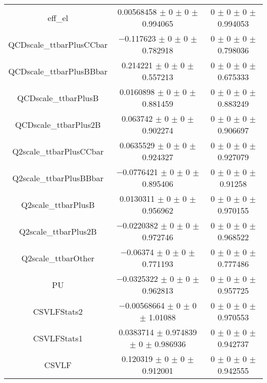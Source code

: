 \begin{table}
\begin{tabular}{ccc}
eff\_el & \num{0.00568458} $\pm$ \num{0} $\pm$ \num{0} $\pm$ \num{0.994065} & \num{0} $\pm$ \num{0} $\pm$ \num{0} $\pm$ \num{0.994053}\\
QCDscale\_ttbarPlusCCbar & \num{-0.117623} $\pm$ \num{0} $\pm$ \num{0} $\pm$ \num{0.782918} & \num{0} $\pm$ \num{0} $\pm$ \num{0} $\pm$ \num{0.798036}\\
QCDscale\_ttbarPlusBBbar & \num{0.214221} $\pm$ \num{0} $\pm$ \num{0} $\pm$ \num{0.557213} & \num{0} $\pm$ \num{0} $\pm$ \num{0} $\pm$ \num{0.675333}\\
QCDscale\_ttbarPlusB & \num{0.0160898} $\pm$ \num{0} $\pm$ \num{0} $\pm$ \num{0.881459} & \num{0} $\pm$ \num{0} $\pm$ \num{0} $\pm$ \num{0.883249}\\
QCDscale\_ttbarPlus2B & \num{0.063742} $\pm$ \num{0} $\pm$ \num{0} $\pm$ \num{0.902274} & \num{0} $\pm$ \num{0} $\pm$ \num{0} $\pm$ \num{0.906697}\\
Q2scale\_ttbarPlusCCbar & \num{0.0635529} $\pm$ \num{0} $\pm$ \num{0} $\pm$ \num{0.924327} & \num{0} $\pm$ \num{0} $\pm$ \num{0} $\pm$ \num{0.927079}\\
Q2scale\_ttbarPlusBBbar & \num{-0.0776421} $\pm$ \num{0} $\pm$ \num{0} $\pm$ \num{0.895406} & \num{0} $\pm$ \num{0} $\pm$ \num{0} $\pm$ \num{0.91258}\\
Q2scale\_ttbarPlusB & \num{0.0130311} $\pm$ \num{0} $\pm$ \num{0} $\pm$ \num{0.956962} & \num{0} $\pm$ \num{0} $\pm$ \num{0} $\pm$ \num{0.970155}\\
Q2scale\_ttbarPlus2B & \num{-0.0220382} $\pm$ \num{0} $\pm$ \num{0} $\pm$ \num{0.972746} & \num{0} $\pm$ \num{0} $\pm$ \num{0} $\pm$ \num{0.968522}\\
Q2scale\_ttbarOther & \num{-0.06374} $\pm$ \num{0} $\pm$ \num{0} $\pm$ \num{0.771193} & \num{0} $\pm$ \num{0} $\pm$ \num{0} $\pm$ \num{0.777486}\\
PU & \num{-0.0325322} $\pm$ \num{0} $\pm$ \num{0} $\pm$ \num{0.962813} & \num{0} $\pm$ \num{0} $\pm$ \num{0} $\pm$ \num{0.957725}\\
CSVLFStats2 & \num{-0.00568664} $\pm$ \num{0} $\pm$ \num{0} $\pm$ \num{1.01088} & \num{0} $\pm$ \num{0} $\pm$ \num{0} $\pm$ \num{0.970553}\\
CSVLFStats1 & \num{0.0383714} $\pm$ \num{0.974839} $\pm$ \num{0} $\pm$ \num{0.986936} & \num{0} $\pm$ \num{0} $\pm$ \num{0} $\pm$ \num{0.942737}\\
CSVLF & \num{0.120319} $\pm$ \num{0} $\pm$ \num{0} $\pm$ \num{0.912001} & \num{0} $\pm$ \num{0} $\pm$ \num{0} $\pm$ \num{0.942555}\\

\end{tabular}
\end{table}
